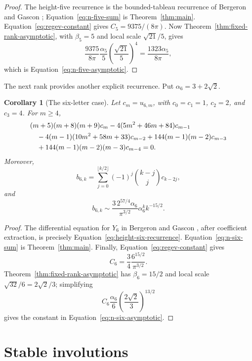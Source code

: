 \documentclass[11pt]{article}
\newtheorem{corollary}[theorem]{Corollary}
\theoremstyle{definition}
\begin{document}
\begin{proof}
The height-five recurrence is the bounded-tableau recurrence of
Bergeron and Gascon \cite{BergeronGascon2000};
Equation~\eqref{eq:n-five-sum} is Theorem~\ref{thm:main}.
Equation~\eqref{eq:regev-constant} gives $C_5=9375/(8\pi)$.  Now
Theorem~\ref{thm:fixed-rank-asymptotic}, with $\beta_5=5$ and local scale
$\sqrt{21}/5$, gives
\[
 \frac{9375}{8\pi}\frac{\alpha_5}{5}
 \left(\frac{\sqrt{21}}5\right)^4
 =\frac{1323\alpha_5}{8\pi},
\]
which is Equation~\eqref{eq:n-five-asymptotic}.
\end{proof}

The next rank provides another explicit recurrence.  Put
$\alpha_6=3+2\sqrt2$.

\begin{corollary}[The six-letter case]\label{cor:n-six}
Let $c_m=u_{6,m}$, with $c_0=c_1=1$, $c_2=2$, and $c_3=4$.  For $m\ge4$,
\begin{align}\label{eq:height-six-recurrence}
 &(m+5)(m+8)(m+9)c_m
 -4(5m^2+46m+84)c_{m-1}\notag\\
 &\quad{}-4(m-1)(10m^2+58m+33)c_{m-2}
 +144(m-1)(m-2)c_{m-3}\notag\\
 &\quad{}+144(m-1)(m-2)(m-3)c_{m-4}=0.
\end{align}
Moreover,
\begin{equation}\label{eq:n-six-sum}
 b_{6,k}=\sum_{j=0}^{\lfloor k/2\rfloor}
 (-1)^j\binom{k-j}{j}c_{k-2j},
\end{equation}
and
\begin{equation}\label{eq:n-six-asymptotic}
 b_{6,k}\sim
 \frac{3\,2^{57/4}\alpha_6}{\pi^{3/2}}
 \alpha_6^k k^{-15/2}.
\end{equation}
\end{corollary}

\begin{proof}
The differential equation for $Y_6$ in Bergeron and Gascon
\cite{BergeronGascon2000}, after coefficient extraction, is precisely
Equation~\eqref{eq:height-six-recurrence}.  Equation~\eqref{eq:n-six-sum}
is Theorem~\ref{thm:main}.  Finally,
Equation~\eqref{eq:regev-constant} gives
\[
 C_6=\frac{3}{4}\frac{6^{15/2}}{\pi^{3/2}}.
\]
Theorem~\ref{thm:fixed-rank-asymptotic} has
$\beta_6=15/2$ and local scale $\sqrt{32}/6=2\sqrt2/3$; simplifying
\[
 C_6\frac{\alpha_6}{6}
 \left(\frac{2\sqrt2}{3}\right)^{13/2}
\]
gives the constant in Equation~\eqref{eq:n-six-asymptotic}.
\end{proof}

\section{Stable involutions}
\end{document}
